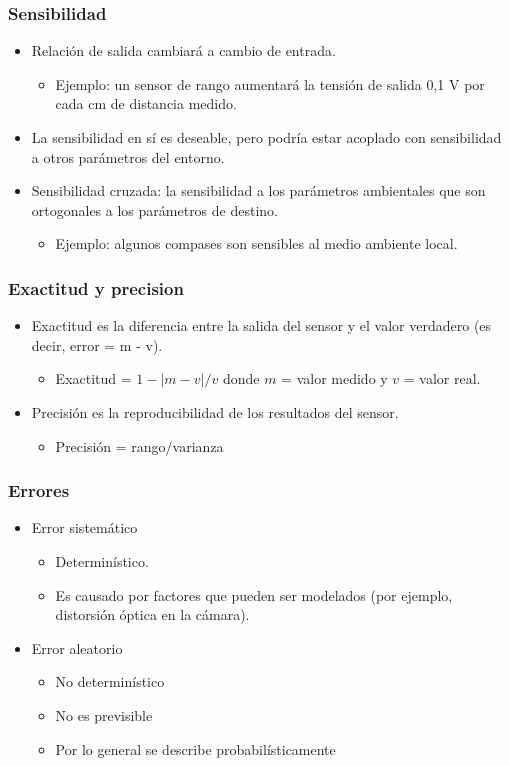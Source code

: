 \documentclass{beamer}
\begin{document}
\begin{frame}
\frametitle{Sensibilidad}
\begin{itemize}
\item Relación de salida cambiará a cambio de entrada. 
\begin{itemize}
\item Ejemplo: un sensor de rango aumentará la tensión de salida 0,1 V por cada cm de distancia medido.
\end{itemize}
\item La sensibilidad en sí es deseable, pero podría estar acoplado con sensibilidad a otros parámetros del entorno.
\item Sensibilidad cruzada: la sensibilidad a los parámetros ambientales que son ortogonales a los parámetros de destino.
\begin{itemize}
\item Ejemplo: algunos compases son sensibles al medio ambiente local.
\end{itemize}
\end{itemize}
\end{frame}

\begin{frame}
\frametitle{Exactitud y precision}
\begin{itemize}
\item Exactitud es la diferencia entre la salida del sensor y el valor verdadero (es decir, error = m - v).
\begin{itemize}
\item Exactitud = $1-|m-v|/v$ donde $m$ = valor medido y $v$ = valor real.
\end{itemize}
\item Precisión es la reproducibilidad de los resultados del sensor.
\begin{itemize}
\item Precisión = rango/varianza
\end{itemize}
\end{itemize}
\end{frame}

\begin{frame}
\frametitle{Errores}
\begin{itemize}
\item Error sistemático
\begin{itemize}
\item Determinístico.
\item Es causado por factores que pueden ser modelados (por ejemplo, distorsión óptica en la cámara).
\end{itemize}
\item Error aleatorio
\begin{itemize}
\item No determinístico
\item No es previsible
\item Por lo general se describe probabilísticamente
\end{itemize}
\end{itemize}
\end{frame}
\end{document}
